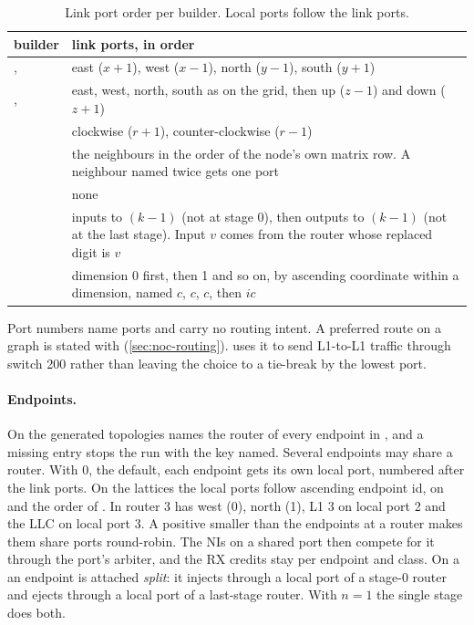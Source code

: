 \begin{table}[htbp]\centering\small
\caption{Link port order per builder. Local ports follow the link ports.}\label{tab:noc-ports}
\begin{tabularx}{\textwidth}{@{}lY@{}}
\toprule builder & link ports, in order \\ \midrule
{},  & east ($x+1$), west ($x-1$), north ($y-1$), south ($y+1$) \\
,  & east, west, north, south as on the grid, then up ($z-1$) and down ($z+1$) \\
 & clockwise ($r+1$), counter-clockwise ($r-1$) \\
 & the neighbours in the order of the node's own matrix row. A neighbour named twice gets one port \\
 & none \\
 & inputs  to $(k-1)$ (not at stage 0), then outputs  to $(k-1)$ (not at the last stage). Input $v$ comes from the router whose replaced digit is $v$ \\
 & dimension 0 first, then 1 and so on, by ascending coordinate within a dimension, named $c$, $c$, $c$, then $i$$c$ \\
\bottomrule
\end{tabularx}
\end{table}

Port numbers name ports and carry no routing intent. A preferred route on a  graph
is stated with  (\cref{sec:noc-routing}).  uses it to send L1-to-L1
traffic through switch 200 rather than leaving the choice to a tie-break by the lowest port.

\paragraph{Endpoints.} On the generated topologies  names the router of
every endpoint in , and a missing entry stops the run with the key named.
Several endpoints may share a router. With  0, the default, each endpoint gets
its own local port, numbered after the link ports. On the lattices the local ports follow
ascending endpoint id, on  and  the order of . In
 router 3 has west (0), north (1), L1 3 on local port 2 and the LLC on
local port 3. A positive  smaller than the endpoints at a router makes them
share ports round-robin. The NIs on a shared port then compete for it through the port's arbiter,
and the RX credits stay per endpoint and class. On a  an endpoint is attached
\emph{split}: it injects through a local port of a stage-0 router and ejects through a local port
of a last-stage router. With $n = 1$ the single stage does both.

